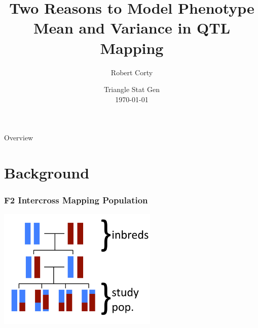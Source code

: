\documentclass{beamer}
\title{Two Reasons to Model Phenotype\\ Mean and Variance in QTL Mapping}
\author{Robert Corty}
\institute{UNC Chapel Hill}
\date{Triangle Stat Gen\\\today}
\begin{document}
\begin{frame}
\titlepage
\end{frame}

\begin{frame}{Overview}
\tableofcontents
\end{frame}


\section{Background}

\begin{frame}\frametitle{F2 Intercross Mapping Population}
    \includegraphics[width = 3in]{F2_diagram}
\end{frame}
\end{document}
